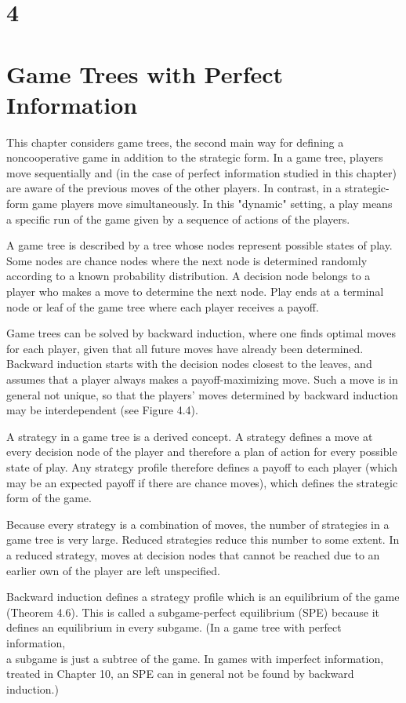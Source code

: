 \documentclass[12pt]{article}
\begin{document}
\section*{4}
\section*{Game Trees with Perfect Information}
This chapter considers game trees, the second main way for defining a noncooperative game in addition to the strategic form. In a game tree, players move sequentially and (in the case of perfect information studied in this chapter) are aware of the previous moves of the other players. In contrast, in a strategic-form game players move simultaneously. In this "dynamic" setting, a play means a specific run of the game given by a sequence of actions of the players.

A game tree is described by a tree whose nodes represent possible states of play. Some nodes are chance nodes where the next node is determined randomly according to a known probability distribution. A decision node belongs to a player who makes a move to determine the next node. Play ends at a terminal node or leaf of the game tree where each player receives a payoff.

Game trees can be solved by backward induction, where one finds optimal moves for each player, given that all future moves have already been determined. Backward induction starts with the decision nodes closest to the leaves, and assumes that a player always makes a payoff-maximizing move. Such a move is in general not unique, so that the players' moves determined by backward induction may be interdependent (see Figure 4.4).

A strategy in a game tree is a derived concept. A strategy defines a move at every decision node of the player and therefore a plan of action for every possible state of play. Any strategy profile therefore defines a payoff to each player (which may be an expected payoff if there are chance moves), which defines the strategic form of the game.

Because every strategy is a combination of moves, the number of strategies in a game tree is very large. Reduced strategies reduce this number to some extent. In a reduced strategy, moves at decision nodes that cannot be reached due to an earlier own of the player are left unspecified.

Backward induction defines a strategy profile which is an equilibrium of the game (Theorem 4.6). This is called a subgame-perfect equilibrium (SPE) because it defines an equilibrium in every subgame. (In a game tree with perfect information,\\
a subgame is just a subtree of the game. In games with imperfect information, treated in Chapter 10, an SPE can in general not be found by backward induction.)
\end{document}
